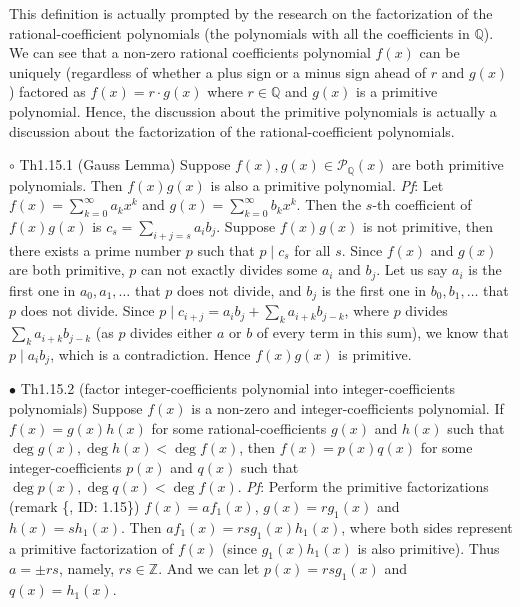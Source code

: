 \documentclass{article}
\begin{document}
\begin{Rmk}{}
    This definition is actually prompted by the research on the factorization of \textcolor{Df}{the rational-coefficient polynomials (the polynomials with all the coefficients in $\mathbb{Q}$)}. We can see that \textcolor{Th}{a non-zero rational coefficients polynomial $f(x)$ can be uniquely (regardless of whether a plus sign or a minus sign ahead of $r$ and $g(x)$) factored as $f(x) = r\cdot g(x)$ where $r\in\mathbb{Q}$ and $g(x)$ is a primitive polynomial.} Hence, the discussion about the primitive polynomials is actually a discussion about the factorization of the rational-coefficient polynomials.
\end{Rmk}

\begin{Th}{$\circ$ Th1.15.1 (Gauss Lemma)}
    Suppose $f(x), g(x)\in\mathcal{P}_\mathbb{\mathbb{Q}}(x)$ are both primitive polynomials. Then $f(x)g(x)$ is also a primitive polynomial.
    \tcblower
    \textit{Pf}: Let $f(x) = \sum_{k=0}^{\infty} a_kx^k$ and $g(x) = \sum_{k=0}^{\infty} b_kx^k$. Then the $s$-th coefficient of $f(x)g(x)$ is $c_s = \sum_{i+j = s} a_ib_{j}$. Suppose $f(x)g(x)$ is not primitive, then there exists a prime number $p$ such that $p\mid c_s$ for all $s$. Since $f(x)$ and $g(x)$ are both primitive, $p$ can not exactly divides some $a_i$ and $b_j$. Let us say $a_i$ is the first one in $a_0, a_1, \dots$ that $p$ does not divide, and $b_j$ is the first one in $b_0, b_1, \dots$ that $p$ does not divide. Since $p\mid c_{i+j} = a_ib_j+\sum_{k}a_{i+k}b_{j-k}$, where $p$ divides $\sum_{k}a_{i+k}b_{j-k}$ (as $p$ divides either $a$ or $b$ of every term in this sum), we know that $p\mid a_ib_j$, which is a contradiction. Hence $f(x)g(x)$ is primitive.
\end{Th}

\begin{Th}{$\bullet$ Th1.15.2 (factor integer-coefficients polynomial into integer-coefficients polynomials)}
    Suppose $f(x)$ is a non-zero and integer-coefficients polynomial. If $f(x) = g(x)h(x)$ for some rational-coefficients $g(x)$ and $h(x)$ such that $\deg g(x), \deg h(x)<\deg f(x)$, then $f(x) = p(x)q(x)$ for some integer-coefficients $p(x)$ and $q(x)$ such that $\deg p(x), \deg q(x)<\deg f(x)$.
    \tcblower
    \textit{Pf}: Perform the primitive factorizations (remark \{, ID: 1.15\}) $f(x) = af_1(x)$, $g(x) = rg_1(x)$ and $h(x) = sh_1(x)$. Then $af_1(x) = rsg_1(x)h_1(x)$, where both sides represent a primitive factorization of $f(x)$ (since $g_1(x)h_1(x)$ is also primitive). Thus $a = \pm rs$, namely, $rs\in\mathbb{Z}$. And we can let $p(x) = rsg_1(x)$ and $q(x) = h_1(x)$. 
\end{Th}
\end{document}

